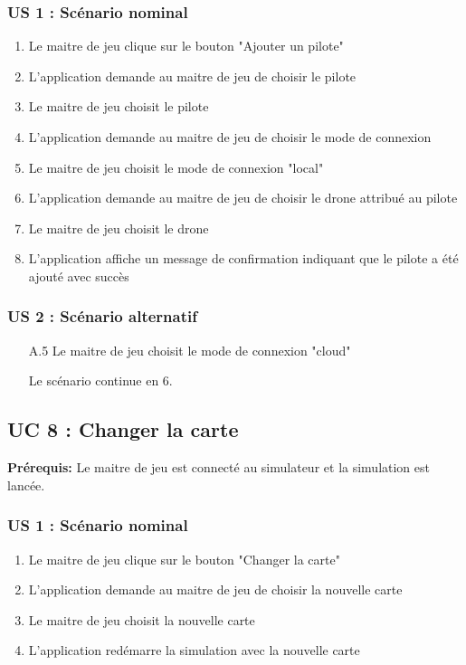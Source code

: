 \documentclass{scrartcl}
\begin{document}
\subsubsection*{US 1 : Scénario nominal}
\begin{enumerate}
    \item Le maitre de jeu clique sur le bouton "Ajouter un pilote"
    \item L'application demande au maitre de jeu de choisir le pilote
    \item Le maitre de jeu choisit le pilote
    \item L'application demande au maitre de jeu de choisir le mode de connexion
    \item Le maitre de jeu choisit le mode de connexion "local"
    \item L'application demande au maitre de jeu de choisir le drone attribué au pilote
    \item Le maitre de jeu choisit le drone
    \item L'application affiche un message de confirmation indiquant que le pilote a été ajouté avec succès
\end{enumerate}

\subsubsection*{US 2 : Scénario alternatif}
\begin{enumerate}
    \item[A.5] Le maitre de jeu choisit le mode de connexion "cloud"
    \item[] Le scénario continue en 6.
\end{enumerate}

\subsection{UC 8 : Changer la carte}
\textbf{Prérequis:} Le maitre de jeu est connecté au simulateur et la simulation est lancée.

\subsubsection*{US 1 : Scénario nominal}
\begin{enumerate}
    \item Le maitre de jeu clique sur le bouton "Changer la carte"
    \item L'application demande au maitre de jeu de choisir la nouvelle carte
    \item Le maitre de jeu choisit la nouvelle carte
    \item L'application redémarre la simulation avec la nouvelle carte
\end{enumerate}
\end{document}
